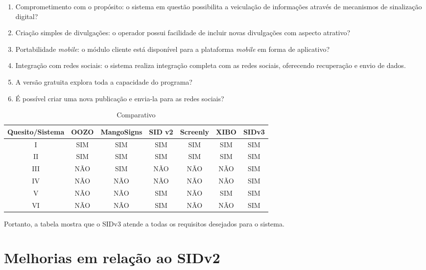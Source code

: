 \begin{enumerate}[label=\Roman*)]
\label{tlb:comparacaoresultados}
	\item Comprometimento com o propósito: o sistema em questão possibilita a veiculação de informações através de mecanismos de sinalização digital?
	\item Criação simples de divulgações: o operador possui facilidade de incluir novas divulgações com aspecto atrativo?
	\item Portabilidade \textit{mobile}: o módulo cliente está disponível para a plataforma \textit{mobile} em forma de aplicativo?
	\item Integração com redes sociais: o sistema realiza integração completa com as redes sociais, oferecendo recuperação e envio de dados.
	\item A versão gratuita explora toda a capacidade do programa?
	\item É possível criar uma nova publicação e envia-la para as redes sociais?
\end{enumerate}

\begin{table}[H]
	\caption{Comparativo}
	\label {tlb:comparativo2}
	\centering
	\begin{tabular}{|c|c|c|c|c|c|c|}
		\hline
		Quesito/Sistema & OOZO & MangoSigns & SID v2 & Screenly & XIBO & SIDv3 \\ \hline
		I 				& SIM  & SIM		& SIM & SIM 	 & SIM	& SIM \\ \hline
		II 				& SIM  & SIM 		& SIM & SIM 	 & SIM		& SIM \\ \hline
		III				& NÃO  & SIM 		& NÃO & NÃO 	 & NÃO		& SIM \\ \hline
		IV 				& NÃO  & NÃO 		& NÃO & NÃO 	 & NÃO		& SIM \\ \hline
		V 				& NÃO  & NÃO 		& SIM & NÃO 	 & SIM		& SIM \\ \hline
		VI 				& NÃO  & NÃO 		& SIM & NÃO 	 & NÃO		& SIM \\ \hline
	\end{tabular}
\end{table}

Portanto, a tabela mostra que o SIDv3 atende a todas os requisitos desejados para o sistema.

\section{Melhorias em relação ao SIDv2}
